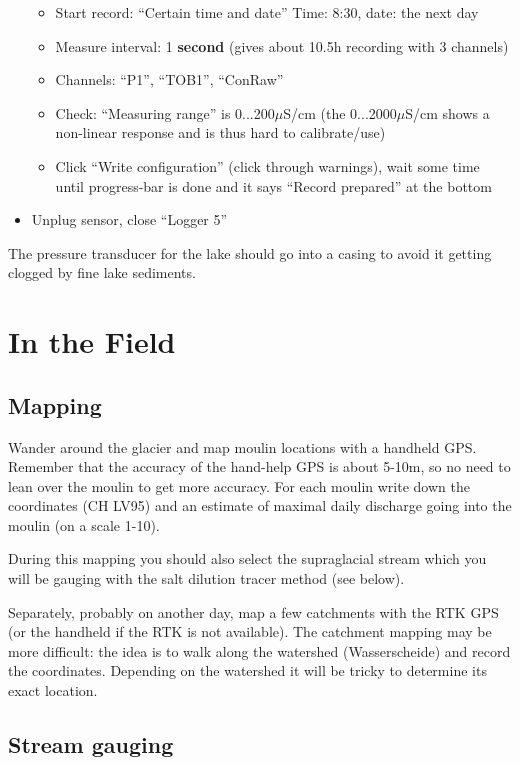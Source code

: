 \documentclass[DIV=15,halfparskip,11pt,headinclude]{scrartcl}
\begin{document}
\begin{itemize}
\begin{itemize}
  \item Start record: ``Certain time and date''
    Time: 8:30, date: the next day
\item Measure interval: 1 \textbf{second} (gives about 10.5h recording
  with 3 channels)
\item Channels: ``P1'', ``TOB1'', ``ConRaw''
  \item Check: ``Measuring range'' is 0...200$\mu$S/cm (the
    0...2000$\mu$S/cm shows a non-linear response and is thus hard to
    calibrate/use)
\item Click ``Write configuration'' (click through warnings), wait
  some time until progress-bar is done and it says ``Record prepared'' at the bottom
\end{itemize}

\item Unplug sensor, close ``Logger 5''
\end{itemize}

The pressure transducer for the lake should go into a casing to avoid
it getting clogged by fine lake sediments.

\section{In the Field}
\subsection{Mapping}
\label{sec-1}

Wander around the glacier and map moulin locations with a handheld
GPS.  Remember that the accuracy of the hand-help GPS is about 5-10m,
so no need to lean over the moulin to get more accuracy.  For each
moulin write down the coordinates (CH LV95) and an estimate of maximal
daily discharge going into the moulin (on a scale 1-10).

During this mapping you should also select the supraglacial stream
which you will be gauging with the salt dilution tracer method (see
below).

Separately, probably on another day, map a few catchments with the
RTK GPS (or the handheld if the RTK is not available).  The
catchment mapping may be more difficult: the idea is to walk along the
watershed (Wasserscheide) and record the coordinates.  Depending on
the watershed it will be tricky to determine its exact location.

\subsection{Stream gauging}
\label{sec-2}
\end{document}
